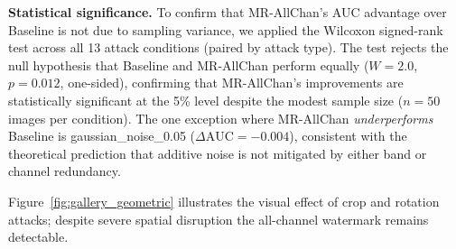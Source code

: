 \documentclass[10pt,twocolumn]{article}
\begin{document}
\textbf{Statistical significance.}
To confirm that MR-AllChan's AUC advantage over Baseline is not due to
sampling variance, we applied the Wilcoxon signed-rank test across all
13 attack conditions (paired by attack type).
The test rejects the null hypothesis that Baseline and MR-AllChan
perform equally ($W{=}2.0$, $p{=}0.012$, one-sided), confirming that
MR-AllChan's improvements are statistically significant at the 5\%
level despite the modest sample size ($n{=}50$ images per condition).
The one exception where MR-AllChan \emph{underperforms} Baseline is
gaussian\_noise\_0.05 ($\Delta\text{AUC}{=}{-0.004}$), consistent with
the theoretical prediction that additive noise is not mitigated by
either band or channel redundancy.

Figure~\ref{fig:gallery_geometric} illustrates the visual effect of
crop and rotation attacks; despite severe spatial disruption the
all-channel watermark remains detectable.
\end{document}
